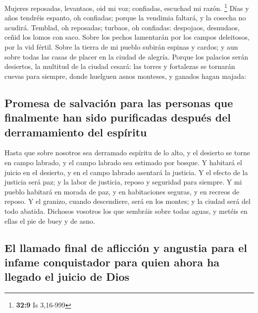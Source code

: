  Mujeres reposadas, levantaos, oid mi voz; confiadas,
escuchad mi razón. \footnote{\textbf{32:9} Is 3,16-999} 
Días y años tendréis espanto, oh confiadas; porque la vendimia faltará,
y la cosecha no acudirá.  Temblad, oh reposadas; turbaos,
oh confiadas: despojaos, desnudaos, ceñid los lomos con saco.
 Sobre los pechos lamentarán por los campos deleitosos, por
la vid fértil.  Sobre la tierra de mi pueblo subirán
espinas y cardos; y aun sobre todas las casas de placer en la ciudad de
alegría.  Porque los palacios serán desiertos, la multitud
de la ciudad cesará: las torres y fortalezas se tornarán cuevas para
siempre, donde huelguen asnos monteses, y ganados hagan majada:

\hypertarget{promesa-de-salvaciuxf3n-para-las-personas-que-finalmente-han-sido-purificadas-despuuxe9s-del-derramamiento-del-espuxedritu}{%
\subsection{Promesa de salvación para las personas que finalmente han
sido purificadas después del derramamiento del
espíritu}\label{promesa-de-salvaciuxf3n-para-las-personas-que-finalmente-han-sido-purificadas-despuuxe9s-del-derramamiento-del-espuxedritu}}

 Hasta que sobre nosotros sea derramado espíritu de lo
alto, y el desierto se torne en campo labrado, y el campo labrado sea
estimado por bosque.  Y habitará el juicio en el desierto,
y en el campo labrado asentará la justicia.  Y el efecto de
la justicia será paz; y la labor de justicia, reposo y seguridad para
siempre.  Y mi pueblo habitará en morada de paz, y en
habitaciones seguras, y en recreos de reposo.  Y el
granizo, cuando descendiere, será en los montes; y la ciudad será del
todo abatida.  Dichosos vosotros los que sembráis sobre
todas aguas, y metéis en ellas el pie de buey y de asno.

\hypertarget{el-llamado-final-de-aflicciuxf3n-y-angustia-para-el-infame-conquistador-para-quien-ahora-ha-llegado-el-juicio-de-dios}{%
\subsection{El llamado final de aflicción y angustia para el infame
conquistador para quien ahora ha llegado el juicio de
Dios}\label{el-llamado-final-de-aflicciuxf3n-y-angustia-para-el-infame-conquistador-para-quien-ahora-ha-llegado-el-juicio-de-dios}}

